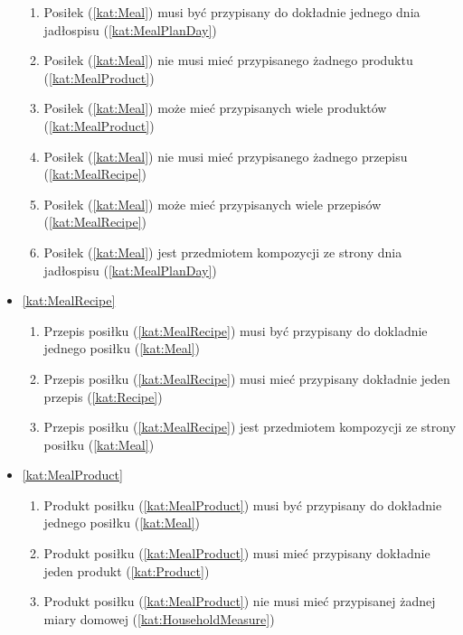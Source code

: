 \begin{itemize}[label={\textbf{Reguły dla}}, wide, labelwidth=!, labelindent=0pt]
    \begin{enumerate}[label={\textbf{REG/\protect\threedigits{\arabic{enumi}}}}, wide, labelwidth=!, align=left, leftmargin=3cm, resume]
        \item Posiłek (\ref{kat:Meal}) musi być przypisany do dokładnie jednego dnia jadłospisu (\ref{kat:MealPlanDay})
        \item Posiłek (\ref{kat:Meal}) nie musi mieć przypisanego żadnego produktu (\ref{kat:MealProduct})
        \item Posiłek (\ref{kat:Meal}) może mieć przypisanych wiele produktów (\ref{kat:MealProduct})
        \item Posiłek (\ref{kat:Meal}) nie musi mieć przypisanego żadnego przepisu (\ref{kat:MealRecipe})
        \item Posiłek (\ref{kat:Meal}) może mieć przypisanych wiele przepisów (\ref{kat:MealRecipe})
        \item Posiłek (\ref{kat:Meal}) jest przedmiotem kompozycji ze strony dnia jadłospisu (\ref{kat:MealPlanDay})
    \end{enumerate}
    \item\ref{kat:MealRecipe}
    \begin{enumerate}[label={\textbf{REG/\protect\threedigits{\arabic{enumi}}}}, wide, labelwidth=!, align=left, leftmargin=3cm, resume]
        \item Przepis posiłku (\ref{kat:MealRecipe}) musi być przypisany do dokladnie jednego posiłku (\ref{kat:Meal})
        \item Przepis posiłku (\ref{kat:MealRecipe}) musi mieć przypisany dokładnie jeden przepis (\ref{kat:Recipe})
        \item Przepis posiłku (\ref{kat:MealRecipe}) jest przedmiotem kompozycji ze strony posiłku (\ref{kat:Meal})
    \end{enumerate}
    \item\ref{kat:MealProduct}
    \begin{enumerate}[label={\textbf{REG/\protect\threedigits{\arabic{enumi}}}}, wide, labelwidth=!, align=left, leftmargin=3cm, resume]
        \item Produkt posiłku (\ref{kat:MealProduct}) musi być przypisany do dokładnie jednego posiłku (\ref{kat:Meal})
        \item Produkt posiłku (\ref{kat:MealProduct}) musi mieć przypisany dokładnie jeden produkt (\ref{kat:Product})
        \item Produkt posiłku (\ref{kat:MealProduct}) nie musi mieć przypisanej żadnej miary domowej (\ref{kat:HouseholdMeasure})

\end{enumerate}
\end{itemize}

